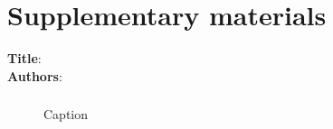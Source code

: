 \documentclass[12pt]{article}
\begin{document}
\clearpage

\newcommand{\beginsupplement}{%
        \setcounter{page}{1}
        \setcounter{table}{0}
        \renewcommand{\thetable}{S\arabic{table}}%
        \setcounter{figure}{0}
        \renewcommand{\thefigure}{S\arabic{figure}}%
        }

\section*{Supplementary materials}

\begin{center}
\textbf{Title}:       \\
\textbf{Authors}:     \\
\end{center}

\beginsupplement


\subsubsection*{}


\begin{figure}[h!]
  \begin{center}
    \caption{Caption }
    \label{fig:label}
  \end{center}
\end{figure}
\end{document}
